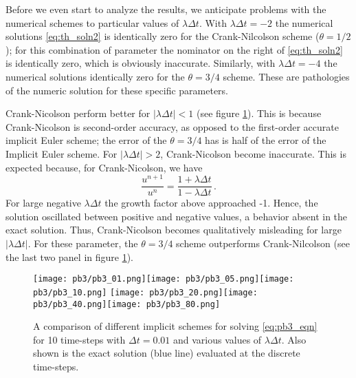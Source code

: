 \documentclass[11pt]{article}
\newcommand{\dt}{\Delta t}
\newcommand{\per}{\, .}
\def\beq{\begin{equation}}
\def\eeq{\end{equation}}
\begin{document}
Before we even start to analyze the results, we anticipate problems with the numerical schemes to particular values of $\lambda \dt$. With $\lambda \dt = -2$ the numerical solutions \eqref{eq:th_soln2}  is identically zero for the Crank-Nilcolson scheme ($\theta = 1/2$); for this combination of parameter the nominator on the right of \eqref{eq:th_soln2} is identically zero, which is obviously inaccurate. Similarly, with $\lambda \dt = -4$ the numerical solutions identically zero for the $\theta = 3/4$ scheme. These are pathologies of the numeric solution for these specific parameters.

Crank-Nicolson perform better for $|\lambda \dt| < 1$ (see figure \ref{fig:pb3}). This is because Crank-Nicolson is second-order accuracy, as opposed to the first-order accurate implicit Euler scheme; the error of the $\theta=3/4$ has is half of the error of the Implicit Euler scheme. For   $|\lambda \dt| > 2$, Crank-Nicolson become inaccurate. This is expected because, for Crank-Nicolson, we have
\beq
\frac{u^{n+1}}{u^n} = \frac{1+\lambda \dt}{1-\lambda \dt}\per
\eeq
For large negative $\lambda \dt$ the growth factor above approached -1. Hence, the solution oscillated between positive and negative values, a behavior absent in the exact solution. Thus, Crank-Nicolson becomes qualitatively misleading for large $|\lambda \dt|$. For these parameter, the $\theta=3/4$ scheme outperforms Crank-Nilcolson (see the last two panel in figure \ref{fig:pb3}). 

\begin{figure}[ht]
\begin{center}
\texttt{[image: pb3/pb3\_01.png]}\texttt{[image: pb3/pb3\_05.png]}\texttt{[image: pb3/pb3\_10.png]}
\texttt{[image: pb3/pb3\_20.png]}\texttt{[image: pb3/pb3\_40.png]}\texttt{[image: pb3/pb3\_80.png]}
\end{center}
\caption{A comparison of different implicit schemes for solving \eqref{eq:pb3_eqn} for 10 time-steps with $\dt=0.01$ and various values of $\lambda \dt$. Also shown is the exact solution (blue line) evaluated at the discrete time-steps.}
\label{fig:pb3}
\end{figure}
\end{document}
